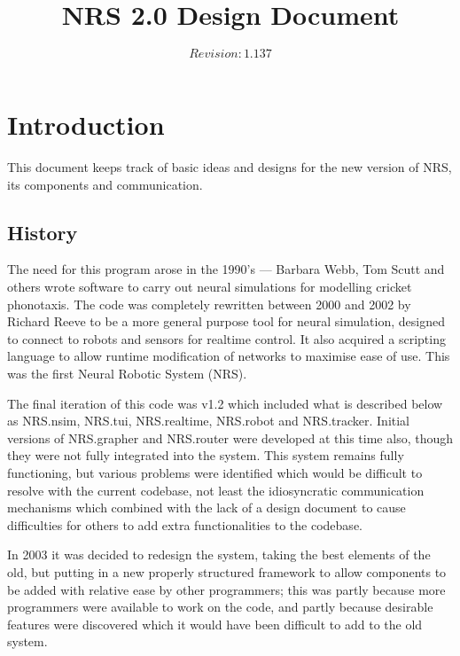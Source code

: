 \documentclass[pdftex,a4paper]{article}
\author{$Revision: 1.137 $}
\title{NRS 2.0 Design Document}
\begin{document}
\date{}
\maketitle

\tableofcontents

\pagebreak

\section{Introduction}

This document keeps track of basic ideas and designs for the new
version of NRS, its components and communication.

\subsection{History}

The need for this program arose in the 1990's --- Barbara Webb, Tom
Scutt and others wrote software to carry out neural simulations for
modelling cricket phonotaxis. The code was completely rewritten
between 2000 and 2002 by Richard Reeve to be a more general purpose
tool for neural simulation, designed to connect to robots and sensors
for realtime control. It also acquired a scripting language to allow
runtime modification of networks to maximise ease of use. This was the
first Neural Robotic System (NRS).

The final iteration of this code was v1.2 which included what is
described below as NRS.nsim, NRS.tui, NRS.realtime, NRS.robot and
NRS.tracker. Initial versions of NRS.grapher and NRS.router were
developed at this time also, though they were not fully integrated
into the system. This system remains fully functioning, but various
problems were identified which would be difficult to resolve with the
current codebase, not least the idiosyncratic communication mechanisms
which combined with the lack of a design document to cause
difficulties for others to add extra functionalities to the codebase.

In 2003 it was decided to redesign the system, taking the best
elements of the old, but putting in a new properly structured
framework to allow components to be added with relative ease by other
programmers; this was partly because more programmers were available
to work on the code, and partly because desirable features were
discovered which it would have been difficult to add to the old system.
\end{document}
